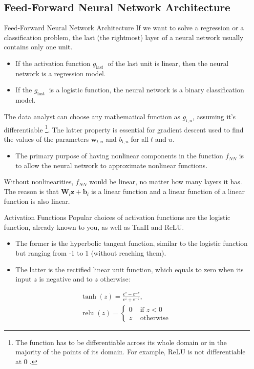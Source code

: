 \documentclass[8pt,dvipsnames]{beamer}
\begin{document}
\subsection{Feed-Forward Neural Network Architecture}
\begin{frame}{Feed-Forward Neural Network Architecture}
	If we want to solve a regression or a classification problem, the last (the rightmost) layer of a neural network usually contains only one unit.
	\begin{itemize}
		\item If the activation function $g_{\text {last }}$ of the last unit is linear, then the neural network is a regression model.
		\item If the $g_{\text {last }}$ is a logistic function, the neural network is a binary classification model.
	\end{itemize}
	The data analyst can choose any mathematical function as $g_{l, u}$, assuming it's differentiable \footnote[frame]{The function has to be differentiable across its whole domain or in the majority of the points of its domain. For example, ReLU is not differentiable at 0 .}. The latter property is essential for gradient descent used to find the values of the parameters $\mathbf{w}_{l, u}$ and $b_{l, u}$ for all $l$ and $u$.
	\begin{itemize}
		\item The primary purpose of having nonlinear components in the function $f_{N N}$ is to allow the neural network to approximate nonlinear functions.
	\end{itemize}
	Without nonlinearities, $f_{N N}$ would be linear, no matter how many layers it has. The reason is that $\mathbf{W}_{l} \mathbf{z}+\mathbf{b}_{l}$ is a linear function and a linear function of a linear function is also linear.
\end{frame}

\begin{frame}{Activation Functions}
	Popular choices of activation functions are the logistic function, already known to you, as well as TanH and ReLU.
	\begin{itemize}
		\item The former is the hyperbolic tangent function, similar to the logistic function but ranging from -1 to 1 (without reaching them).
		\item The latter is the rectified linear unit function, which equals to zero when its input $z$ is negative and to $z$ otherwise:
	\end{itemize}
	$$
		\begin{gathered}
			\tanh (z)=\frac{e^{z}-e^{-z}}{e^{z}+e^{-z}}, \\
			\operatorname{relu}(z)= \begin{cases}0 & \text { if } z<0    \\
             z & \text { otherwise }\end{cases}
		\end{gathered}
	$$
\end{frame}
\end{document}
